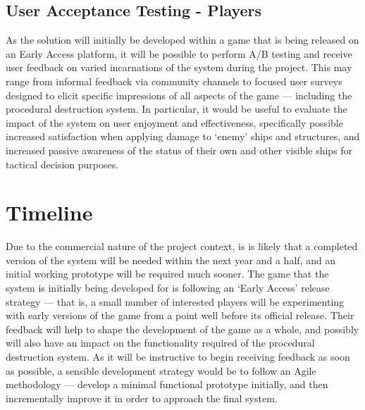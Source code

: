\documentclass[11pt]{report}
\begin{document}
	\section{User Acceptance Testing - Players}
		As the solution will initially be developed within a game that is being released on an Early Access platform, it will be possible to perform A/B testing and receive user feedback on varied incarnations of the system during the project. This may range from informal feedback via community channels to focused user surveys designed to elicit specific impressions of all aspects of the game --- including the procedural destruction system. In particular, it would be useful to evaluate the impact of the system on user enjoyment and effectiveness, specifically possible increased satisfaction when applying damage to `enemy' ships and structures, and increased passive awareness of the status of their own and other visible ships for tactical decision purposes.

\chapter{Timeline} \label{chap:time}
	Due to the commercial nature of the project context, is is likely that a completed version of the system will be needed within the next year and a half, and an initial working prototype will be required much sooner. The game that the system is initially being developed for is following an `Early Access' release strategy --- that is, a small number of interested players will be experimenting with early versions of the game from a point well before its official release. Their feedback will help to shape the development of the game as a whole, and possibly will also have an impact on the functionality required of the procedural destruction system. As it will be instructive to begin receiving feedback as soon as possible, a sensible development strategy would be to follow an Agile methodology --- develop a minimal functional prototype initially, and then incrementally improve it in order to approach the final system.
\end{document}
